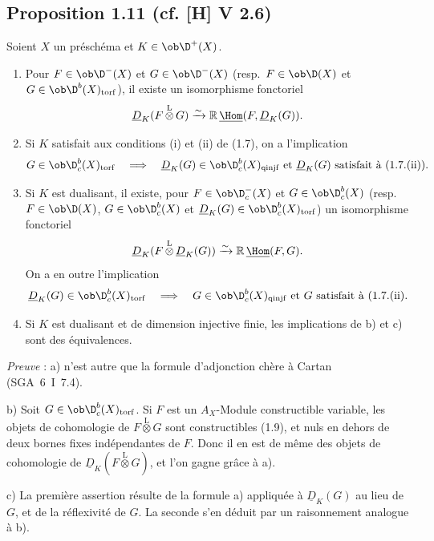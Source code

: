 \subsection*{Proposition 1.11 (cf. [H] V 2.6)}
Soient $X$ un préschéma et $K \in \ob \D^{+}(X)$.
\begin{enumerate}
\item[a)] Pour $F \in \ob \D^{-}(X)$ et $G \in \ob \D^{-}(X)$ (resp.~$F \in \ob \D(X)$ et $G \in \ob \D^{b}(X)_{\mathrm{torf}}$), il existe un isomorphisme fonctoriel
\[
\underline{D}_K(F \mathop{\otimes}\limits^{\mathrm{L}} G) \xrightarrow{\sim} \mathbb{R}\,\underline{\Hom}(F, \underline{D}_K(G)).
\]
\item[b)] Si $K$
satisfait aux conditions (i) et (ii) de (1.7), on a l'implication
\[
G \in \ob \D_c^{b}(X)_{\mathrm{torf}} \quad \Longrightarrow \quad \underline{D}_K(G) \in \ob \D_c^{b}(X)_{\mathrm{qinjf}} \text{ et } \underline{D}_K(G) \text{ satisfait à (1.7.(ii)).}
\]
\item[c)] Si $K$ est dualisant, il existe, pour $F \in \ob \D_c^{-}(X)$ et $G \in \ob \D_c^{b}(X)$ (resp.~$F \in \ob \D(X)$, $G \in \ob \D_c^{b}(X)$ et $\underline{D}_K(G) \in \ob \D_c^{b}(X)_{\mathrm{torf}}$) un isomorphisme fonctoriel
\[
\underline{D}_K(F \mathop{\otimes}\limits^{\mathrm{L}} \underline{D}_K(G)) \xrightarrow{\sim} \mathbb{R}\,\underline{\Hom}(F, G).
\]
On a en outre l'implication
\[
\underline{D}_K(G) \in \ob \D_c^{b}(X)_{\mathrm{torf}} \quad \Longrightarrow \quad G \in \ob \D_c^{b}(X)_{\mathrm{qinjf}} \text{ et } G \text{ satisfait à (1.7.(ii).}
\]
\item[d)] Si $K$ est dualisant et de dimension injective finie, les implications de b) et c) sont des équivalences.
\end{enumerate}

\emph{Preuve} : a) n'est autre que la formule d'adjonction chère à Cartan (SGA~6~I~7.4).

b) Soit $G \in \ob \D_c^{b}(X)_{\mathrm{torf}}$. Si $F$ est un $A_X$-Module constructible variable, les objets de cohomologie de $F \mathop{\otimes}\limits^{\mathrm{L}} G$ sont constructibles (1.9), et nuls en dehors de deux bornes fixes indépendantes de $F$. Donc il en est de même des objets de cohomologie de $\underline{D}_K(F \mathop{\otimes}\limits^{\mathrm{L}} G)$, et l'on gagne grâce à a).

c) La première assertion résulte de la formule a) appliquée à $\underline{D}_K(G)$ au lieu de $G$, et de la réflexivité de $G$. La seconde s'en déduit par un raisonnement analogue à b).

